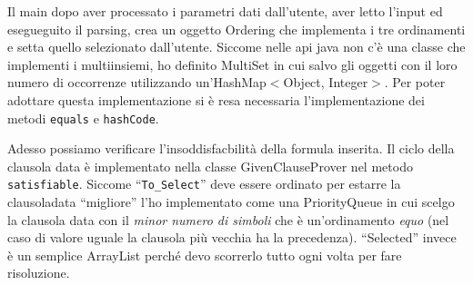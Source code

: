 \documentclass[a4paper,11pt]{article} %
\newcommand{\sintassi}{\texttt}
\newcommand{\classe}{\textsf}
\newcommand{\metodo}{\texttt}
\newcommand{\campo}{\texttt}
\begin{document}
Il main dopo aver processato i parametri dati dall'utente, aver letto l'input
ed esegueguito il parsing,
%
crea un oggetto \classe{Ordering} che implementa i tre ordinamenti 
e setta quello selezionato dall'utente.
Siccome nelle api java non c'è una classe che implementi
i multiinsiemi, ho definito \classe{MultiSet} in cui 
salvo gli oggetti con il loro numero di occorrenze
utilizzando 
un'\classe{HashMap$<$Object, Integer$>$}.  Per poter adottare questa implementazione si è resa 
necessaria l'implementazione dei metodi \metodo{equals} e \metodo{hashCode}.

Adesso possiamo verificare l'insoddisfacbilità della formula inserita.
Il ciclo della clausola data %
è implementato nella classe
\classe{GivenClauseProver} nel metodo \metodo{satisfiable}. %
Siccome ``\campo{To\_Select}'' deve essere ordinato per estarre la
clausoladata ``migliore'' l'ho
implementato come una
\classe{PriorityQueue} in cui scelgo la clausola data con il \emph{minor numero
di simboli} che è un'ordinamento \emph{equo} (nel caso di valore uguale
la clausola più vecchia ha la precedenza). ``Selected'' invece è un
semplice ArrayList perché devo scorrerlo tutto ogni volta per fare risoluzione.
\end{document}
